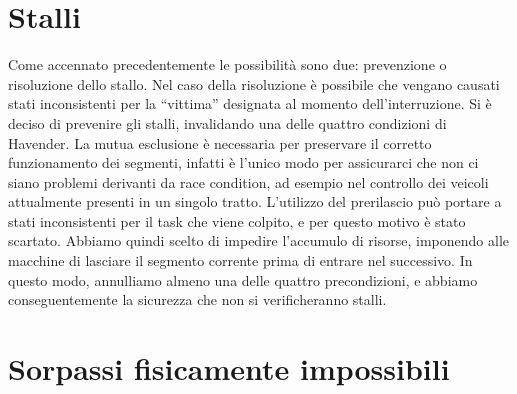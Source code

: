 
\section{Stalli}
Come accennato precedentemente le possibilità sono due: prevenzione o risoluzione dello stallo. Nel caso della risoluzione è possibile che vengano causati stati inconsistenti per la “vittima” designata al momento dell'interruzione.
Si è deciso di prevenire gli stalli, invalidando una delle quattro condizioni di Havender.
La mutua esclusione è necessaria per preservare il corretto funzionamento dei segmenti, infatti è l'unico modo per assicurarci che non ci siano problemi derivanti da race condition, ad esempio nel controllo dei veicoli attualmente presenti in un singolo tratto.
L'utilizzo del prerilascio può portare a stati inconsistenti per il task che viene colpito, e per questo motivo è stato scartato.
Abbiamo quindi scelto di impedire l'accumulo di risorse, imponendo alle macchine di lasciare il segmento corrente prima di entrare nel successivo. In questo modo, annulliamo almeno una delle quattro precondizioni, e abbiamo conseguentemente la sicurezza che non si verificheranno stalli.


\section{Sorpassi fisicamente impossibili}

